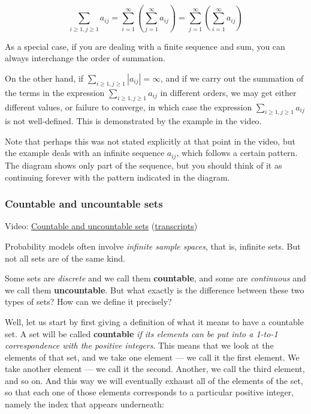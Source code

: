 \documentclass[pdftex, brazil, 12pt, twoside]{article}
\begin{document}
\begin{equation*}
  \sum_{i \ge 1, j \ge 1} a_{ij} = \sum_{i=1}^{\infty} \left(\sum_{j=1}^{\infty} a_{ij}\right) = \sum_{j=1}^{\infty} \left(\sum_{i=1}^{\infty} a_{ij}\right)
\end{equation*}

As a special case, if you are dealing with a finite sequence and sum,
you can always interchange the order of summation.

On the other hand, if $\sum_{i \ge 1, j \ge 1} |a_{ij}| = \infty$, and
if we carry out the summation of the terms in the expression $\sum_{i \ge 1, j \ge 1} a_{ij}$
in different orders, we may get either different values, or failure to
converge, in which case the expression $\sum_{i \ge 1, j \ge 1} a_{ij}$
is not well-defined. This is demonstrated by the example in the video.

Note that perhaps this was not stated explicitly at that point in the video,
but the example deals with an infinite sequence $a_{ij}$, which follows
a certain pattern. The diagram shows only part of the sequence, but
you should think of it as continuing forever with the pattern
indicated in the diagram.

\subsubsection{Countable and uncountable sets}
\label{un1-math-countable-incontable-sets}

Video: \href{https://www.youtube.com/watch?v=q0cVDeluL3c}{Countable and uncountable sets}
(\href{Unit-1/02\_mathematical\_background/mb\_9\_transcripts.pdf}{transcripts})

Probability models often involve \emph{infinite sample
spaces}, that is, infinite sets.
But not all sets are of the same kind.

Some sets are \emph{discrete} and we call them \textbf{countable}, and some
are \emph{continuous} and we call them \textbf{uncountable}.
But what exactly is the difference between these two
types of sets?
How can we define it precisely?

Well, let us start by first giving a definition of what it
means to have a countable set.
A set will be called \textbf{countable} \emph{if its elements can be put
into a 1-to-1 correspondence with the positive integers}.
This means that we look at the elements of that set, and we
take one element --- we call it the first element.
We take another element --- we call it the second.
Another, we call the third element, and so on.
And this way we will eventually exhaust all of the
elements of the set, so that each one of those elements
corresponds to a particular positive integer, namely the
index that appears underneath:
\end{document}
